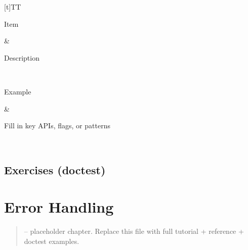 \documentclass[a4paper,11pt,english]{sphinxmanual}
\begin{document}
\begin{savenotes}\sphinxattablestart
\sphinxthistablewithglobalstyle
\centering
\begin{tabulary}{\linewidth}[t]{TT}
\sphinxtoprule
\begin{varwidth}[t]{}
\sphinxstyletheadfamily \sphinxAtStartPar
Item
\sphinxbeforeendvarwidth
\end{varwidth}%
&\begin{varwidth}[t]{}
\sphinxstyletheadfamily \sphinxAtStartPar
Description
\sphinxbeforeendvarwidth
\end{varwidth}%
\\
\sphinxmidrule
\sphinxtableatstartofbodyhook\begin{varwidth}[t]{}
\sphinxAtStartPar
Example
\sphinxbeforeendvarwidth
\end{varwidth}%
&\begin{varwidth}[t]{}
\sphinxAtStartPar
Fill in key APIs, flags, or patterns
\sphinxbeforeendvarwidth
\end{varwidth}%
\\
\sphinxbottomrule
\end{tabulary}
\sphinxtableafterendhook\par
\sphinxattableend\end{savenotes}


\subsection{Exercises (doctest)}
\label{\detokenize{core_language/control_flow:exercises-doctest}}
\begin{sphinxVerbatim}[commandchars=\\\{\}]
\end{sphinxVerbatim}

\sphinxstepscope


\section{Error Handling}
\label{\detokenize{core_language/error_handling:error-handling}}\label{\detokenize{core_language/error_handling::doc}}\begin{quote}

\sphinxAtStartPar
{} – placeholder chapter. Replace this file with full tutorial + reference + doctest examples.
\end{quote}
\end{document}
